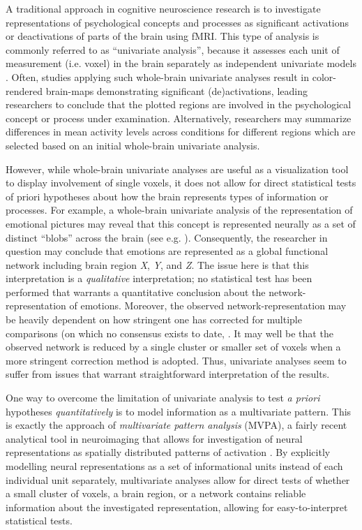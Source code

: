 \documentclass[jou,12pt,a4paper]{apa6}
\begin{document}
A traditional approach in cognitive neuroscience research is to investigate representations of psychological concepts and processes as significant activations or deactivations of parts of the brain using fMRI. This type of analysis is commonly referred to as ``univariate analysis'', because it assesses each unit of measurement (i.e. voxel) in the brain separately as independent univariate models \cite{friston1994}. Often, studies applying such whole-brain univariate analyses result in color-rendered brain-maps demonstrating significant (de)activations, leading researchers to conclude that the plotted regions are involved in the psychological concept or process under examination. Alternatively, researchers may summarize differences in mean activity levels across conditions for different regions which are selected based on an initial whole-brain univariate analysis.  

However, while whole-brain univariate analyses are useful as a visualization tool to display involvement of single voxels, it does not allow for direct statistical tests of priori hypotheses about how the brain represents types of information or processes. For example, a whole-brain univariate analysis of the representation of emotional pictures may reveal that this concept is represented neurally as a set of distinct ``blobs'' across the brain (see e.g. ). Consequently, the researcher in question may conclude that emotions are represented as a global functional network including brain region \emph{X}, \emph{Y}, and \emph{Z}. The issue here is that this interpretation is a \emph{qualitative} interpretation; no statistical test has been performed that warrants a quantitative conclusion about the network-representation of emotions. Moreover, the observed network-representation may be heavily dependent on how stringent one has corrected for multiple comparisons (on which no consensus exists to date, . It may well be that the observed network is reduced by a single cluster or smaller set of voxels when a more stringent correction method is adopted. %
Thus, univariate analyses seem to suffer from issues that warrant straightforward interpretation of the results. 

One way to overcome the limitation of univariate analysis to test \emph{a priori} hypotheses \emph{quantitatively} is to model information as a multivariate pattern. This is exactly the approach of \emph{multivariate pattern analysis} (MVPA), a fairly recent analytical tool in neuroimaging that allows for investigation of neural representations as spatially distributed patterns of activation \cite{haxby2001,kriegeskorte2006}. By explicitly modelling neural representations as a set of informational units instead of each individual unit separately, multivariate analyses allow for direct tests of whether a small cluster of voxels, a brain region, or a network contains reliable information about the investigated representation, allowing for easy-to-interpret statistical tests.        
\end{document}
